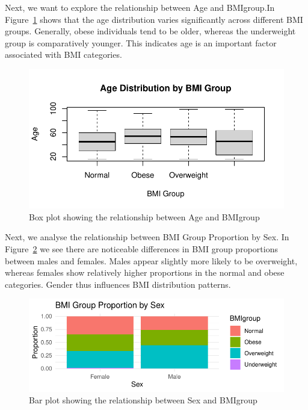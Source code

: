 \documentclass[
  letterpaper,
  DIV=11,
  numbers=noendperiod]{scrartcl}
\begin{document}
Next, we want to explore the relationship between Age and BMIgroup.In
Figure~\ref{fig-box1} shows that the age distribution varies
significantly across different BMI groups. Generally, obese individuals
tend to be older, whereas the underweight group is comparatively
younger. This indicates age is an important factor associated with BMI
categories.

\begin{figure}

{\centering \includegraphics{Data-analysis-12-main_files/figure-pdf/fig-box1-1.pdf}

}

\caption{\label{fig-box1}Box plot showing the relationship between Age
and BMIgroup}

\end{figure}

Next, we analyse the relationship between BMI Group Proportion by Sex.
In Figure~\ref{fig-bar2} we see there are noticeable differences in BMI
group proportions between males and females. Males appear slightly more
likely to be overweight, whereas females show relatively higher
proportions in the normal and obese categories. Gender thus influences
BMI distribution patterns.

\begin{figure}

{\centering \includegraphics{Data-analysis-12-main_files/figure-pdf/fig-bar2-1.pdf}

}

\caption{\label{fig-bar2}Bar plot showing the relationship between Sex
and BMIgroup}

\end{figure}
\end{document}
